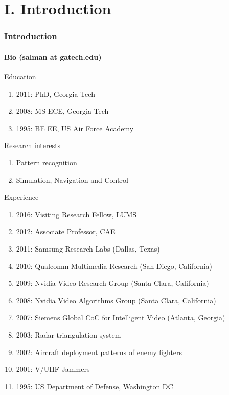\section{I. Introduction}
\begin{frame}
\frametitle{Introduction}
\framesubtitle{Bio (salman at gatech.edu)}
\begin{changemargin}{-0.18in}{0in}
\vspace{-0.1in}
{\color{red}Education}
\begin{enumerate}\scriptsize
\item 2011: PhD, Georgia Tech
\item 2008: MS ECE, Georgia Tech
\item 1995: BE EE, US Air Force Academy
\end{enumerate}
{\color{red}Research interests}
\begin{enumerate}\scriptsize
\item Pattern recognition
\item Simulation, Navigation and Control
\end{enumerate}
{\color{red}Experience}
\begin{enumerate}\scriptsize
\item 2016: Visiting Research Fellow, LUMS
\item 2012: Associate Professor, CAE
\item 2011: Samsung Research Labs (Dallas, Texas)
\item 2010: Qualcomm Multimedia Research (San Diego, California)
\item 2009: Nvidia Video Research Group (Santa Clara, California)
\item 2008: Nvidia Video Algorithms Group (Santa Clara, California)
\item 2007: Siemens Global CoC for Intelligent Video (Atlanta, Georgia)
\item 2003: Radar triangulation system
\item 2002: Aircraft deployment patterns of enemy fighters
\item 2001: V/UHF Jammers
\item 1995: US Department of Defense, Washington DC

\end{enumerate}
\end{changemargin}
\end{frame}


